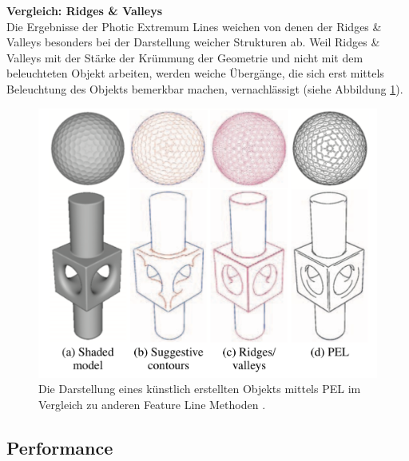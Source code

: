 \documentclass{paperStyle}
\begin{document}
\textbf{Vergleich: Ridges \& Valleys}\\
Die Ergebnisse der Photic Extremum Lines weichen von denen der Ridges \& Valleys besonders bei der Darstellung weicher Strukturen ab.
Weil Ridges \& Valleys mit der Stärke der Krümmung der Geometrie und nicht mit dem beleuchteten Objekt arbeiten, werden weiche Übergänge, die sich erst mittels Beleuchtung des Objekts bemerkbar machen, vernachlässigt (siehe Abbildung \ref{vglpel2}). 
\begin{figure}
	\centering
		\includegraphics[width=0.9\linewidth]{vglpel2.png}
	\caption{Die Darstellung eines künstlich erstellten Objekts mittels PEL im Vergleich zu anderen Feature Line Methoden \cite{Xie2007}.}
	\label{vglpel2}
\end{figure}
\subsection{Performance}
\end{document}
